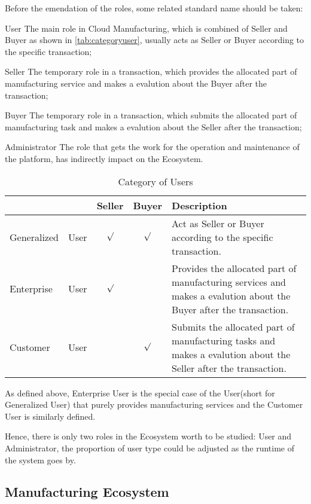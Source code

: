 Before the emendation of the roles, some related standard name should be taken:
\begin{asparadesc}
\item[User] The main role in Cloud Manufacturing, which is combined of Seller and Buyer as shown in \autoref{tab:categoryuser}, usually acts as Seller or Buyer according to the specific transaction;
\item[Seller] The temporary role in a transaction, which provides the allocated part of manufacturing service and makes a evalution about the Buyer after the transaction;
\item[Buyer] The temporary role in a transaction, which submits the allocated part of manufacturing task and makes a evalution about the Seller after the transaction;
\item[Administrator] The role that gets the work for the operation and maintenance of the platform, has indirectly impact on the Ecosystem.
\end{asparadesc}
\begin{table}[htbp]
  \centering\small
  \caption{Category of Users}
    \begin{tabularx}{\textwidth}{llccX}
    \toprule
        &  & Seller & Buyer & Description \\
    \midrule
    Generalized & User & $\surd$ & $\surd$ & Act as Seller or Buyer according to the specific transaction. \\
    Enterprise & User & $\surd$ & &  Provides the allocated part of manufacturing services and makes a evalution about the Buyer after the transaction. \\
    Customer & User& & $\surd$ &  Submits the allocated part of manufacturing tasks and makes a evalution about the Seller after the transaction.\\
    \bottomrule
    \end{tabularx}%
  \label{tab:categoryuser}%
\end{table}%
As defined above, Enterprise User is the special case of the User(short for Generalized User) that purely provides manufacturing services and the Customer User is similarly defined.

Hence, there is only two roles in the Ecosystem worth to be studied: User and Administrator, the proportion of user type could be adjusted as the runtime of the system goes by.



\subsection{Manufacturing Ecosystem} %
\label{sub:manufacturing_ecosystem}

